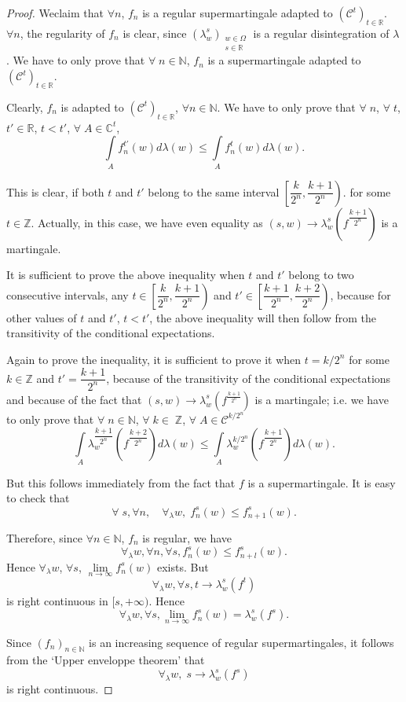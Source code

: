 \begin{proof}
We\pageoriginale claim that $\forall n$, $f_n$ is a regular
supermartingale adapted to $(\mathscr{C}^t)_{t\in
  \mathbb{R}}$. $\forall n$, the regularity of $f_n$ is clear, since
$(\lambda^s_w)_{\substack{w \in \Omega\\ s\in \mathbb{R}}}$ is a
regular disintegration of $\lambda$. We have to only prove that $\forall \; n \in  \mathbb{N}$,
$f_n$ is a supermartingale adapted to $(\mathscr{C}^t)_{t \in
  \mathbb{R}}$. 

Clearly, $f_n$ is adapted to $(\mathscr{C}^t)_{t \in \mathbb{R}}$,
$\forall n \in \mathbb{N}$. We have to only prove that $\forall \; n$,
$\forall \; t$, $t' \in \mathbb{R}$, $t < t'$, $\forall \; A \in
\mathbb{C}^t$,
$$
\int\limits_A f^{t'}_n (w) d \lambda(w) \leq \int\limits_A f^t_n(w) d
\lambda (w). 
$$

This is clear, if both $t$ and $t'$ belong to the same interval
$\left[ \dfrac{k}{2^n} , \dfrac{k+1}{2^n} \right).$  for some $t \in
  \mathbb{Z}$. Actually, in this case, we have even equality as $(s,w)
  \to \lambda^s_w(f^{\dfrac{k+1}{2^n}})$ is a martingale. 

It is sufficient to prove the above inequality when $t$ and $t'$
belong to two consecutive intervals, any $t \in \left[ \dfrac{k}{2^n},
  \dfrac{k+1}{2^n}\right)$ and $t'\in \left[ \dfrac{k+1}{2^n},
    \dfrac{k+2}{2^n} \right)$, because for other values of $t$ and
    $t'$, $t<t'$, the above inequality will then follow from the
    transitivity of the conditional expectations. 

Again to prove the inequality, it is sufficient to prove it when $t =
k/2^n$ for some $k \in \mathbb{Z}$ and $t' = \dfrac{k+1}{2^n}$,
because of the transitivity of the conditional expectations and
because of the fact that $(s,w) \to \lambda^s_w
(f^{\frac{k+1}{2^n}})$ is a martingale; i.e. we have to only prove
that $\forall \; n \in \mathbb{N}$, $\forall \; k \in \; \mathbb{Z}$,
$\forall \; A \in \mathscr{C}^{k/2^n}$
$$
\int\limits_A \lambda^{\dfrac{k+1}{2^n}}_w (f^{\dfrac{k+2}{2^n}}) d
\lambda(w) \leq \int\limits_A \lambda^{k/2^n}_w(f^{\dfrac{k+1}{2^n}})
d\lambda(w). 
$$

But this follows immediately from the fact that $f$ is a
supermartingale. It is easy to check that 
$$
\forall \; s, \forall n, \quad \forall_\lambda w, \; f^s_n(w) \leq
f^s_{n+1} (w). 
$$

Therefore, since $\forall n \in \mathbb{N}$, $f_n$ is regular, we have 
$$ 
\forall_\lambda w, \forall n , \forall s, f^s_n(w) \leq f^s_{n+l}
(w).  
$$\pageoriginale
Hence $\forall_\lambda w$, $\forall s$, $\lim\limits_{n \to \infty}
f^s_n(w)$ exists. But
$$
\forall_\lambda w, \forall s, t \to \lambda^s_w(f^t)
$$
is right continuous in $[s ,+ \infty)$. Hence
$$
\forall_\lambda w, \forall s, \lim\limits_{n \to \infty} f^s_n(w) =
\lambda^s_w(f^s). 
$$

Since $(f_n)_{n \in \mathbb{N}}$ is an increasing sequence of regular
supermartingales, it follows from the `Upper enveloppe theorem' that
$$
\forall_\lambda w, \; s \to \lambda^s_w(f^s)
$$
is right continuous. 
\end{proof}

